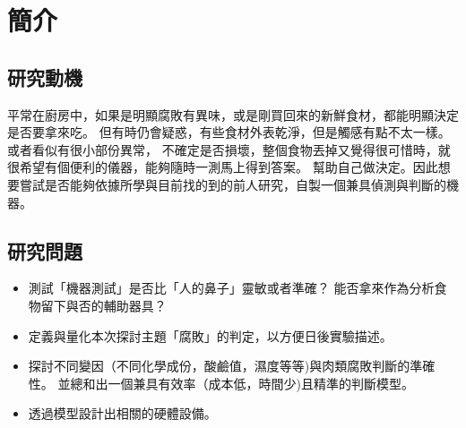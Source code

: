 \chapter{簡介}

\section{研究動機}
平常在廚房中，如果是明顯腐敗有異味，或是剛買回來的新鮮食材，都能明顯決定是否要拿來吃。
但有時仍會疑惑，有些食材外表乾淨，但是觸感有點不太一樣。或者看似有很小部份異常，
不確定是否損壞，整個食物丟掉又覺得很可惜時，就很希望有個便利的儀器，能夠隨時一測馬上得到答案。
幫助自己做決定。因此想要嘗試是否能夠依據所學與目前找的到的前人研究，自製一個兼具偵測與判斷的機器。

\section{研究問題}
\begin{itemize}
	\item 測試「機器測試」是否比「人的鼻子」靈敏或者準確？
		能否拿來作為分析食物留下與否的輔助器具？
	\item 定義與量化本次探討主題「腐敗」的判定，以方便日後實驗描述。
	\item 探討不同變因（不同化學成份，酸鹼值，濕度等等)與肉類腐敗判斷的準確性。
		並總和出一個兼具有效率（成本低，時間少)且精準的判斷模型。
	\item 透過模型設計出相關的硬體設備。
\end{itemize}